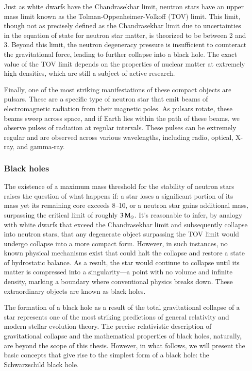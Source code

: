 \documentclass[main.tex]{subfiles}
\begin{document}
    Just as white dwarfs have the Chandrasekhar limit, neutron stars have an upper mass limit known as the Tolman-Oppenheimer-Volkoff (TOV) limit. This limit, though not as precisely defined as the Chandrasekhar limit due to uncertainties in the equation of state for neutron star matter, is theorized to be between 2 and 3\msun. Beyond this limit, the neutron degeneracy pressure is insufficient to counteract the gravitational force, leading to further collapse into a black hole. The exact value of the TOV limit depends on the properties of nuclear matter at extremely high densities, which are still a subject of active research.

    Finally, one of the most striking manifestations of these compact objects are pulsars. These are a specific type of neutron star that emit beams of electromagnetic radiation from their magnetic poles. As pulsars rotate, these beams sweep across space, and if Earth lies within the path of these beams, we observe pulses of radiation at regular intervals. These pulses can be extremely regular and are observed across various wavelengths, including radio, optical, X-ray, and gamma-ray.

    \subsubsection{Black holes}
    \resetinlineenum
    The existence of a maximum mass threshold for the stability of neutron stars raises the question of what happens if: \inlineitem a star loses a significant portion of its mass yet its remaining core exceeds \numrange{8}{10}\msun, or \inlineitem a neutron star gains additional mass, surpassing the critical limit of roughly $3\mathrm{\,M_\odot}$.  It's reasonable to infer, by analogy with white dwarfs that exceed the Chandrasekhar limit and subsequently collapse into neutron stars, that any degenerate object surpassing the TOV limit would undergo collapse into a more compact form. However, in such instances, no known physical mechanisms exist that could halt the collapse and restore a state of hydrostatic balance. As a result, the star would continue to collapse until its matter is compressed into a singularity---a point with no volume and infinite density, marking a boundary where conventional physics breaks down. These extraordinary objects are known as black holes.

    The formation of a black hole as a result of the total gravitational collapse of a star represents one of the most striking predictions of general relativity and modern stellar evolution theory. The precise relativistic description of gravitational collapse and the mathematical properties of black holes, naturally, are beyond the scope of this thesis. However, in what follows, we will present the basic concepts that give rise to the simplest form of a black hole: the Schwarzschild black hole.
\end{document}
